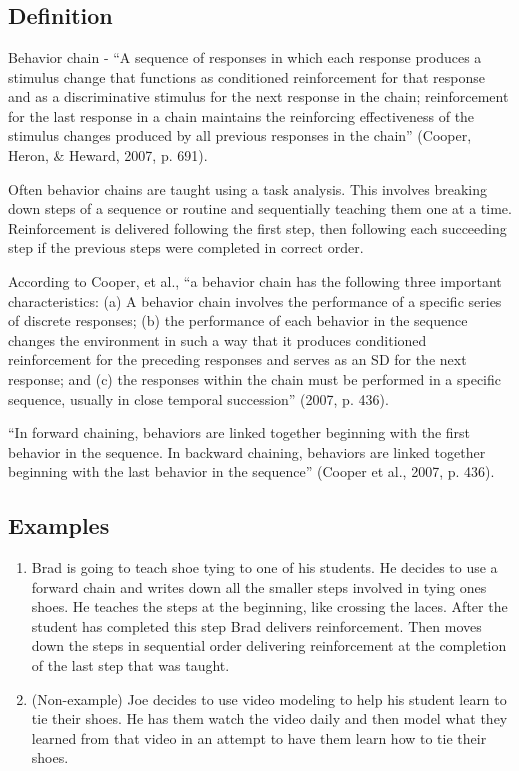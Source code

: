 \clearpage \section{\fourdSix{}}
\subsection{Definition}  
Behavior chain - ``A sequence of responses in which each response produces a stimulus change that functions as conditioned reinforcement for that response and as a discriminative stimulus for the next response in the chain; reinforcement for the last response in a chain maintains the reinforcing effectiveness of the stimulus changes produced by all previous responses in the chain'' (Cooper, Heron, \& Heward, 2007, p. 691).

Often behavior chains are taught using a task analysis. This involves breaking down steps of a sequence or routine and sequentially teaching them one at a time. Reinforcement is delivered following the first step, then following each succeeding step if the previous steps were completed in correct order.

According to Cooper, et al., ``a behavior chain has the following three important characteristics: (a) A behavior chain involves the performance of a specific series of discrete responses; (b) the performance of each behavior in the sequence changes the environment in such a way that it produces conditioned reinforcement for the preceding responses and serves as an SD  for the next response; and (c) the responses within the chain must be performed in a specific sequence, usually in close temporal succession'' (2007, p. 436).

``In forward chaining, behaviors are linked together beginning with the first behavior in the sequence. In backward chaining, behaviors are linked together beginning with the last behavior in the sequence'' (Cooper et al., 2007, p. 436). 

\subsection{Examples}
\begin{enumerate}
\item Brad is going to teach shoe tying to one of his students. He decides to use a forward chain and writes down all the smaller steps involved in tying ones shoes. He teaches the steps at the beginning, like crossing the laces. After the student has completed this step Brad delivers reinforcement.  Then moves down the steps in sequential order delivering reinforcement at the completion of the last step that was taught.
%
\item (Non-example) Joe decides to use video modeling to help his student learn to tie their shoes. He has them watch the video daily and then model what they learned from that video in an attempt to have them learn how to tie their shoes.
\end{enumerate}
%
